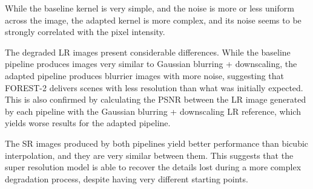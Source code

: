         While the baseline kernel is very simple, and the noise is more or less uniform across the image, the adapted kernel is more complex, and its noise seems to be strongly correlated with the pixel intensity.

        The degraded LR images present considerable differences. While the baseline pipeline produces images very similar to Gaussian blurring + downscaling, 
        the adapted pipeline produces blurrier images with more noise, suggesting that FOREST-2 delivers scenes with less resolution than what was initially expected. 
        This is also confirmed by calculating the PSNR between the LR image generated by each pipeline with the Gaussian blurring + downscaling LR reference, which yields worse results for the adapted pipeline.
        
        The SR images produced by both pipelines yield better performance than bicubic interpolation, and they are very similar between them.
        This suggests that the super resolution model is able to recover the details lost during a more complex degradation process, despite having very different starting points.

